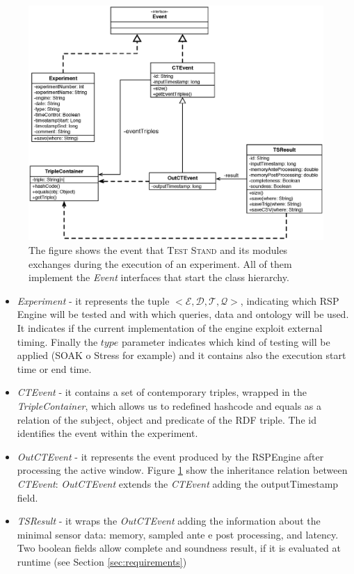 \begin{figure}[tbh]
  \centering
	\includegraphics[width=\linewidth]{images/uml_events}
	\caption[UML Schema: \name Execution Events]{The figure shows the event that \name \textsc{Test Stand} and its modules 	exchanges during the execution of an experiment. All of them implement the \textit{Event} interfaces that start the class 	hierarchy.} 
	\label{fig:uml_events}
\end{figure}

\begin{itemize}
\item \textit{Experiment} - it represents the tuple $<\mathcal{E}, \mathcal{D},\mathcal{T},\mathcal{Q}>$, indicating which RSP Engine will be tested and with which queries, data and ontology will be used. It indicates if the current implementation of the engine exploit external timing. Finally the $type$ parameter indicates which kind of testing will be applied (SOAK o Stress for example) and it contains also the execution start time or end time.
\item \textit{CTEvent} - it contains a set of contemporary triples, wrapped in the \textit{TripleContainer}, which allows us to redefined hashcode and equals as a relation of the subject, object and predicate of the RDF triple. The id identifies the event within the experiment.
\item \textit{OutCTEvent} - it represents the event produced by the RSPEngine after processing the active window. Figure \ref{fig:uml_events} show the inheritance relation between \textit{CTEvent}:  \textit{OutCTEvent} extends the \textit{CTEvent} adding the outputTimestamp field.
\item \textit{TSResult} - it wraps the \textit{OutCTEvent} adding the information about the minimal sensor data: memory, sampled ante e post processing, and latency. Two boolean fields allow complete and soundness result, if it is evaluated at runtime (see Section \ref{sec:requirements})
\end{itemize}

